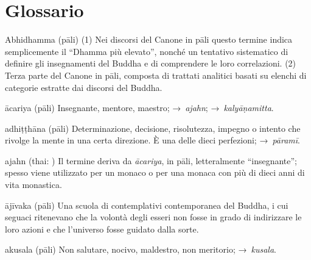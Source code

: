 
\chapter{Glossario}

\begin{glossarydescription}


\item[Abhidhamma] (pāli) (1) Nei discorsi del Canone in pāli questo termine
  indica semplicemente il ``Dhamma più elevato'', nonché un tentativo
  sistematico di definire gli insegnamenti del Buddha e di comprendere le loro
  correlazioni. (2) Terza parte del Canone in pāli, composta di trattati
  analitici basati su elenchi di categorie estratte dai discorsi del Buddha.

\item[ācariya] (pāli) Insegnante, mentore, maestro; →~\emph{ajahn};
  →~\emph{kalyāṇamitta}.

\item[adhiṭṭhāna] (pāli) Determinazione, decisione, risolutezza, impegno o
  intento che rivolge la mente in una certa direzione. È una delle dieci
  perfezioni; →~\emph{pāramī}.

\item[ajahn] (thai: ) Il termine deriva da \emph{ācariya}, in pāli,
  letteralmente ``insegnante''; spesso viene utilizzato per un monaco o per una
  monaca con più di dieci anni di vita monastica.

\item[ājīvaka] (pāli) Una scuola di contemplativi contemporanea del Buddha, i
  cui seguaci ritenevano che la volontà degli esseri non fosse in grado di
  indirizzare le loro azioni e che l'universo fosse guidato dalla sorte.

\item[akusala] (pāli) Non salutare, nocivo, maldestro, non meritorio;
  →~\emph{kusala}.


\end{glossarydescription}
